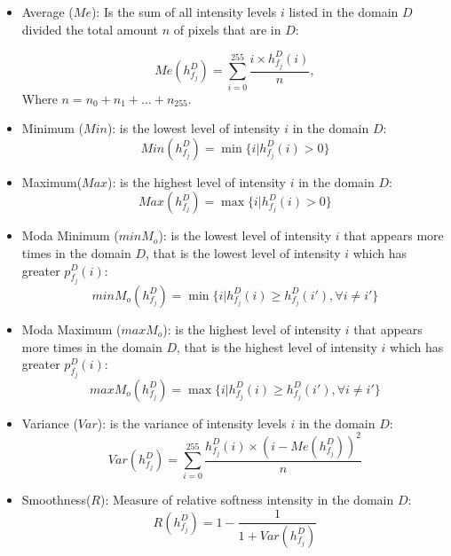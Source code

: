 \begin{itemize}
    \item Average ($Me$): Is the sum of all intensity levels $i$ listed in the domain $D$ divided the total amount $n$ of pixels that are in $D$:
		
\begin{equation}
\label{promedio}
   Me(h_{f_j}^D) = \sum_{i=0}^{255}\frac{i\times h_{f_j}^D(i)}{n},
\end{equation}		
Where $n = n_0 + n_1 + ... + n_{255}$.

    \item Minimum ($Min$): is the lowest level of intensity $i$ in the domain $D$:
\begin{equation}
\label{minimo}
	Min(h_{f_j}^D) = \min\{i|h_{f_j}^D(i)>0\}
\end{equation}		
		\item Maximum($Max$): is the highest level of intensity $i$ in the domain $D$:
\begin{equation}
\label{maximo}
   Max(h_{f_j}^D) = \max\{i|h_{f_j}^D(i)>0\}
\end{equation}		
 		\item Moda Minimum ($minM_o$): is the lowest level of intensity $i$ that appears more times in the domain $D$, that is the lowest level of intensity $i$ which has greater $p_{f_j}^{D}(i)$:
\begin{equation}
\label{ModaMinimo}
   minM_o(h_{f_j}^D) = \min\{i|h_{f_j}^D(i) \geq h_{f_j}^D(i'), \forall i\neq i'\}
\end{equation}		
\item Moda Maximum ($maxM_o$): is the highest level of intensity $i$ that appears more times in the domain $D$, that is the highest level of intensity $i$ which has greater $p_{f_j}^{D}(i)$:
\begin{equation}
\label{ModaMinimo}
   maxM_o(h_{f_j}^D) = \max\{i|h_{f_j}^D(i) \geq h_{f_j}^D(i'), \forall i\neq i'\}
\end{equation}				
    
		
		\item Variance ($Var$): is the variance of intensity levels $i$ in the domain $D$:
  \begin{equation}
\label{varianza}
   Var(h_{f_j}^D) = \sum_{i=0}^{255}\frac{h_{f_j}^D(i)\times(i - Me(h_{f_j}^D))^2}{n}
\end{equation}		
		\item Smoothness($R$): Measure of relative softness intensity in the domain $D$:
 \begin{equation}
\label{Suavidad}
   R(h_{f_j}^D) = 1-\frac{1}{1+Var(h_{f_j}^D)}
\end{equation}		
		

\end{itemize}


